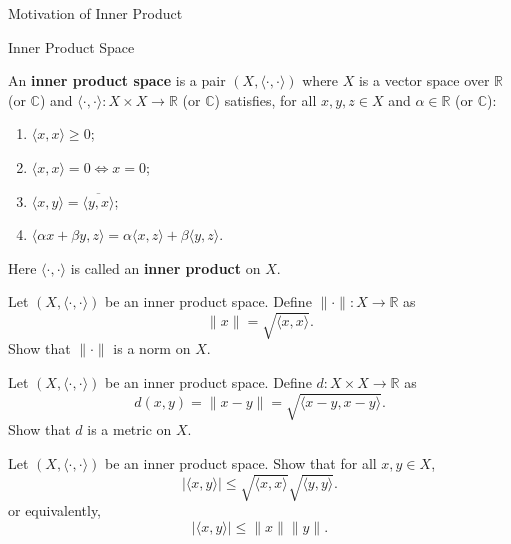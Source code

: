 \documentclass[12pt, a4paper]{article}
\begin{document}
\clearpage

\begin{heading}
    Motivation of Inner Product
\end{heading}

\clearpage

\begin{heading}
    Inner Product Space
\end{heading}

\vspace{10pt}

\begin{definition}
    An \textbf{inner product space} is a pair $(X,\langle\cdot,\cdot\rangle)$ where
    $X$ is a vector space over $\mathbb{R}$ (or $\mathbb{C}$) and
    $\langle\cdot,\cdot\rangle:X\times X\to\mathbb{R}$ (or $\mathbb{C}$) satisfies,
    for all $x,y,z\in X$ and $\alpha\in\mathbb{R}$ (or $\mathbb{C}$):
    \begin{enumerate}[label=(IP\arabic*)]
    \item $\langle x,x\rangle\ge 0$;
    \item $\langle x,x\rangle=0 \iff x=0$;
    \item $\langle x,y\rangle=\overline{\langle y,x\rangle}$;
    \item $\langle \alpha x+ \beta y,z\rangle=\alpha\langle x,z\rangle+ \beta \langle y,z\rangle$.
    \end{enumerate}
    Here $\langle\cdot,\cdot\rangle$ is called an \textbf{inner product} on $X$.
\end{definition}

\clearpage

\begin{theorem}
    Let $(X,\langle\cdot,\cdot\rangle)$ be an inner product space. Define
    $\|\cdot\|:X\to\mathbb{R}$ as
    \[
        \|x\|=\sqrt{\langle x,x\rangle}.
    \]
    Show that $\|\cdot\|$ is a norm on $X$.
\end{theorem}

\clearpage

\begin{theorem}
    Let $(X,\langle\cdot,\cdot\rangle)$ be an inner product space. Define
    $d:X\times X\to\mathbb{R}$ as
    \[
        d(x,y)=\|x-y\|=\sqrt{\langle x-y,x-y\rangle}.
    \]
    Show that $d$ is a metric on $X$.
    
\end{theorem}

\clearpage

\begin{theorem}
    Let $(X,\langle\cdot,\cdot\rangle)$ be an inner product space. Show that for all
    $x,y\in X$,
    \[
        |\langle x,y\rangle|\le \sqrt{\langle x,x\rangle}\sqrt{\langle y,y\rangle}.
    \]
    or equivalently,
    \[
        |\langle x,y\rangle|\le \|x\|\|y\|.
    \]
\end{theorem}





\EndPage
\end{document}
